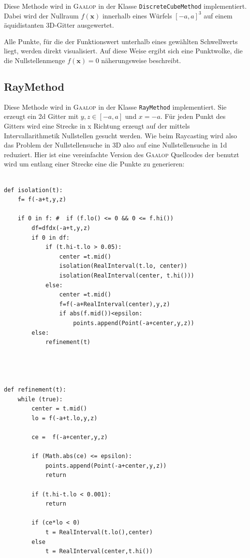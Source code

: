 \documentclass[
	ngerman,%
	accentcolor=9c,%
	ruledheaders=section,%
	class=report,%
	thesis={type=bachelor},%
	fontsize=11pt,%
	parskip=half-,%
	custommargins=true,%
	marginpar=false,%
]{tudapub}
\begin{document}
Diese Methode wird in \textsc{Gaalop} in der Klasse \texttt{DiscreteCubeMethod} implementiert. Dabei wird der Nullraum \( f(\mathbf{x}) \) innerhalb eines Würfels \( [-a, a]^3 \) auf einem äquidistanten 3D-Gitter ausgewertet. 

Alle Punkte, für die der Funktionswert unterhalb eines gewählten Schwellwerts liegt, werden direkt visualisiert. Auf diese Weise ergibt sich eine Punktwolke, die die Nullstellenmenge \( f(\mathbf{x}) = 0 \) näherungsweise beschreibt.

\subsection{RayMethod}
Diese Methode wird in \textsc{Gaalop} in der Klasse \texttt{RayMethod} implementiert. Sie erzeugt ein 2d Gitter mit \(y,z \in [-a,a]\) und \(x=-a\). Für jeden Punkt des Gitters wird eine Strecke in x Richtung erzeugt auf der mittels Intervallarithmetik Nullstellen gesucht werden. Wie beim Raycasting wird also das Problem der Nullstellensuche in 3D also auf eine Nullstellensuche in 1d reduziert.
Hier ist eine vereinfachte Version des \textsc{Gaalop} Quellcodes der benutzt wird um entlang einer Strecke eine die Punkte zu generieren:
\begin{verbatim}

def isolation(t):
    f= f(-a+t,y,z)
    
    if 0 in f: #  if (f.lo() <= 0 && 0 <= f.hi())
        df=dfdx(-a+t,y,z) 
        if 0 in df:
            if (t.hi-t.lo > 0.05):
                center =t.mid()
                isolation(RealInterval(t.lo, center))
                isolation(RealInterval(center, t.hi()))
            else:
                center =t.mid()
                f=f(-a+RealInterval(center),y,z)
                if abs(f.mid())<epsilon:
                    points.append(Point(-a+center,y,z))
        else:
            refinement(t)




def refinement(t):
    while (true):
        center = t.mid()
        lo = f(-a+t.lo,y,z)
        
        ce =  f(-a+center,y,z)
        
        if (Math.abs(ce) <= epsilon):
            points.append(Point(-a+center,y,z))
            return
            
        if (t.hi-t.lo < 0.001):
            return
    
        if (ce*lo < 0) 
            t = RealInterval(t.lo(),center)
        else
            t = RealInterval(center,t.hi())
\end{verbatim}
\end{document}

